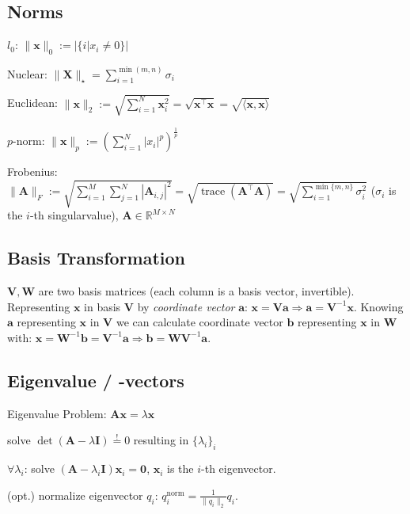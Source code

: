 \documentclass[a4paper, 11pt, landscape]{article}
\begin{document}
\begin{multicols*}{3}
\subsection{Norms}
\begin{inparadesc}
	\item[\color{red}$l_0$:] $\|\mathbf{x}\|_0 := |\{i | x_i \neq 0\}|$
	\item[\color{red}Nuclear:] $\|\mathbf{X}\|_\star = \sum_{i=1}^{\min(m, n)} \sigma_i$
	\item[\color{red}Euclidean:] $\|\mathbf{x}\|_2 := \sqrt{\sum_{i=1}^{N} \mathbf{x}_i^2} = \sqrt{\mathbf{x}^\top \mathbf{x}} = \sqrt{\langle \mathbf{x}, \mathbf{x} \rangle}$
	\item[\color{red}$p$-norm:] $\|\mathbf{x}\|_p := \left( \sum_{i=1}^{N} |x_i|^p \right)^{\frac{1}{p}}$
	\item[\color{red}Frobenius:] $\|\mathbf{A}\|_F :=\allowbreak \sqrt{\sum_{i=1}^{M} \sum_{j=1}^{N} |\mathbf{A}_{i, j}|^2} =\allowbreak \sqrt{\operatorname{trace}(\mathbf{A}^\top \mathbf{A})} =\allowbreak \sqrt{\sum_{i=1}^{\min\{m, n\}} \sigma_i^2}$ ($\sigma_i$ is the $i$-th singularvalue), $\mathbf{A} \in \mathbb{R}^{M \times N}$
\end{inparadesc}

\subsection{Basis Transformation}
$\mathbf{V}, \mathbf{W}$ are two basis matrices (each column is a basis vector, invertible). Representing $\mathbf{x}$ in basis $\mathbf{V}$ by \emph{coordinate vector} $\mathbf{a}$: $\mathbf{x} = \mathbf{V} \mathbf{a} \Rightarrow \mathbf{a} = \mathbf{V}^{-1} \mathbf{x}$. Knowing $\mathbf{a}$ representing $\mathbf{x}$ in $\mathbf{V}$ we can calculate coordinate vector $\mathbf{b}$ representing $\mathbf{x}$ in $\mathbf{W}$ with: $\mathbf{x} = \mathbf{W}^{-1} \mathbf{b} = \mathbf{V}^{-1} \mathbf{a} \Rightarrow \mathbf{b} = \mathbf{W} \mathbf{V}^{-1} \mathbf{a}$.

\subsection{Eigenvalue / -vectors}
Eigenvalue Problem: $\mathbf{Ax} = \lambda \mathbf{x}$
\begin{compactenum}
	\item solve $\operatorname{det}(\mathbf{A} - \lambda \mathbf{I}) \overset{!}{=} 0$ resulting in $\{\lambda_i\}_i$
	\item $\forall \lambda_i$:
		solve $(\mathbf{A} - \lambda_i \mathbf{I}) \mathbf{x}_i = \mathbf{0}$, $\mathbf{x}_i$ is the $i$-th eigenvector.
	\item (opt.) normalize eigenvector $q_i$: $q_i^{\text{norm}} = \frac{1}{\|q_i\|_2} q_i$.
\end{compactenum}


\end{multicols*}
\end{document}
